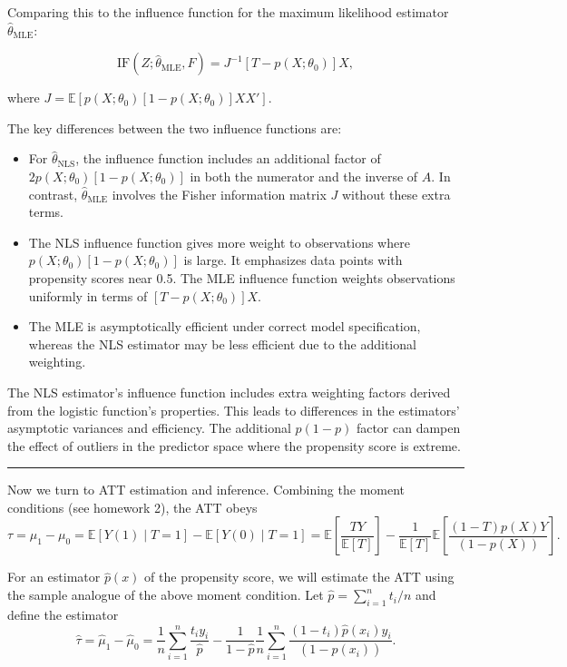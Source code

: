 \documentclass{article}
\newenvironment{colorparagraph}[1]{\par\color{#1}}{\par}
\begin{document}
Comparing this to the influence function for the maximum likelihood estimator \( \hat{\theta}_{\text{MLE}} \):

\[
\text{IF}(Z; \hat{\theta}_{\text{MLE}}, F) = J^{-1} [T - p(X; \theta_0)] X,
\]

where \( J = \mathbb{E} \left[ p(X; \theta_0) [1 - p(X; \theta_0)] X X' \right] \).

The key differences between the two influence functions are:

\begin{itemize}
    \item For \( \hat{\theta}_{\text{NLS}} \), the influence function includes an additional factor of \( 2 p(X; \theta_0) [1 - p(X; \theta_0)] \) in both the numerator and the inverse of \( A \). In contrast, \( \hat{\theta}_{\text{MLE}} \) involves the Fisher information matrix \( J \) without these extra terms.
    \item The NLS influence function gives more weight to observations where \( p(X; \theta_0) [1 - p(X; \theta_0)] \) is large. It emphasizes data points with propensity scores near 0.5. The MLE influence function weights observations uniformly in terms of \( [T - p(X; \theta_0)] X \).
    \item The MLE is asymptotically efficient under correct model specification, whereas the NLS estimator may be less efficient due to the additional weighting.
\end{itemize}

The NLS estimator's influence function includes extra weighting factors derived from the logistic function's properties. This leads to differences in the estimators' asymptotic variances and efficiency. The additional $p(1 - p)$ factor can dampen the effect of outliers in the predictor space where the propensity score is extreme.

\begin{colorparagraph}{questioncolor}
\rule{\textwidth}{0.5pt}
Now we turn to ATT estimation and inference.
Combining the moment conditions (see homework 2), the ATT obeys
\[
\tau = \mu_1 - \mu_0 = \mathbb{E}[Y(1) \mid T = 1] - \mathbb{E}[Y(0) \mid T = 1] = \mathbb{E} \left[\frac{TY}{\mathbb{E}[T]} \right] - \frac{1}{\mathbb{E}[T]} \mathbb{E} \left[ \frac{(1 - T) p(X) Y}{(1 - p(X))} \right].
\]

For an estimator \( \hat{p}(x) \) of the propensity score, we will estimate the ATT using the sample analogue of the above moment condition.
Let \( \hat{p} = \sum_{i=1}^n t_i / n \) and define the estimator
\[
\hat{\tau} = \hat{\mu}_1 - \hat{\mu}_0 = \frac{1}{n} \sum_{i=1}^n \frac{t_i y_i}{\hat{p}} - \frac{1}{1 - \hat{p}} \frac{1}{n} \sum_{i=1}^n \frac{(1 - t_i) \hat{p}(x_i) y_i}{(1 - \hat{p}(x_i))}.
\]
\end{colorparagraph}
\end{document}
